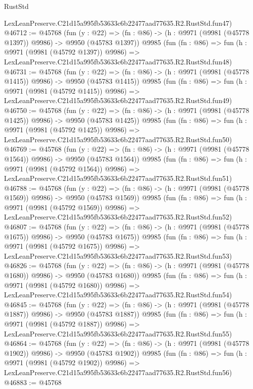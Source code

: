 \begin{lexlean}{RustStd}
\begin{coremodule}
    LexLeanPreserve.C21d15a995fb53633c6b22477aad77635.R2.RustStd.fun47)
@46712 := @45768
    (fun (y : @22) =>
    (fn : @86) -> (h : @9971 (@9981 (@45778 @1397)) @9986) -> @9950 (@45783 @1397))
    @9985
    (fun (fn : @86) =>
    fun (h : @9971 (@9981 (@45792 @1397)) @9986) =>
    LexLeanPreserve.C21d15a995fb53633c6b22477aad77635.R2.RustStd.fun48)
@46731 := @45768
    (fun (y : @22) =>
    (fn : @86) -> (h : @9971 (@9981 (@45778 @1415)) @9986) -> @9950 (@45783 @1415))
    @9985
    (fun (fn : @86) =>
    fun (h : @9971 (@9981 (@45792 @1415)) @9986) =>
    LexLeanPreserve.C21d15a995fb53633c6b22477aad77635.R2.RustStd.fun49)
@46750 := @45768
    (fun (y : @22) =>
    (fn : @86) -> (h : @9971 (@9981 (@45778 @1425)) @9986) -> @9950 (@45783 @1425))
    @9985
    (fun (fn : @86) =>
    fun (h : @9971 (@9981 (@45792 @1425)) @9986) =>
    LexLeanPreserve.C21d15a995fb53633c6b22477aad77635.R2.RustStd.fun50)
@46769 := @45768
    (fun (y : @22) =>
    (fn : @86) -> (h : @9971 (@9981 (@45778 @1564)) @9986) -> @9950 (@45783 @1564))
    @9985
    (fun (fn : @86) =>
    fun (h : @9971 (@9981 (@45792 @1564)) @9986) =>
    LexLeanPreserve.C21d15a995fb53633c6b22477aad77635.R2.RustStd.fun51)
@46788 := @45768
    (fun (y : @22) =>
    (fn : @86) -> (h : @9971 (@9981 (@45778 @1569)) @9986) -> @9950 (@45783 @1569))
    @9985
    (fun (fn : @86) =>
    fun (h : @9971 (@9981 (@45792 @1569)) @9986) =>
    LexLeanPreserve.C21d15a995fb53633c6b22477aad77635.R2.RustStd.fun52)
@46807 := @45768
    (fun (y : @22) =>
    (fn : @86) -> (h : @9971 (@9981 (@45778 @1675)) @9986) -> @9950 (@45783 @1675))
    @9985
    (fun (fn : @86) =>
    fun (h : @9971 (@9981 (@45792 @1675)) @9986) =>
    LexLeanPreserve.C21d15a995fb53633c6b22477aad77635.R2.RustStd.fun53)
@46826 := @45768
    (fun (y : @22) =>
    (fn : @86) -> (h : @9971 (@9981 (@45778 @1680)) @9986) -> @9950 (@45783 @1680))
    @9985
    (fun (fn : @86) =>
    fun (h : @9971 (@9981 (@45792 @1680)) @9986) =>
    LexLeanPreserve.C21d15a995fb53633c6b22477aad77635.R2.RustStd.fun54)
@46845 := @45768
    (fun (y : @22) =>
    (fn : @86) -> (h : @9971 (@9981 (@45778 @1887)) @9986) -> @9950 (@45783 @1887))
    @9985
    (fun (fn : @86) =>
    fun (h : @9971 (@9981 (@45792 @1887)) @9986) =>
    LexLeanPreserve.C21d15a995fb53633c6b22477aad77635.R2.RustStd.fun55)
@46864 := @45768
    (fun (y : @22) =>
    (fn : @86) -> (h : @9971 (@9981 (@45778 @1902)) @9986) -> @9950 (@45783 @1902))
    @9985
    (fun (fn : @86) =>
    fun (h : @9971 (@9981 (@45792 @1902)) @9986) =>
    LexLeanPreserve.C21d15a995fb53633c6b22477aad77635.R2.RustStd.fun56)
@46883 := @45768

\end{coremodule}
\end{lexlean}
